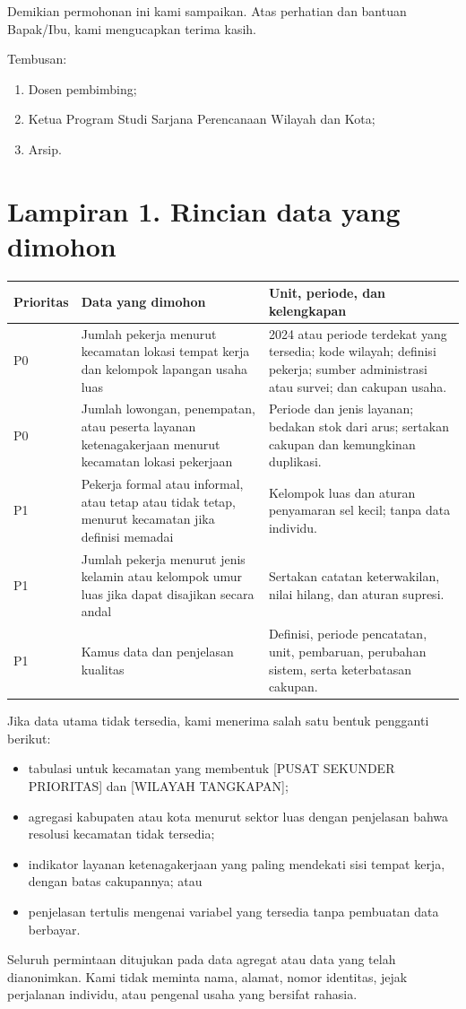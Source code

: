 \documentclass[12pt]{article}
\newcommand{\PusatSekunder}{[PUSAT SEKUNDER PRIORITAS]}
\newcommand{\WilayahTangkapan}{[WILAYAH TANGKAPAN]}
\newcommand{\PeriodeData}{2024 atau periode terdekat yang tersedia}
\begin{document}
Demikian permohonan ini kami sampaikan. Atas perhatian dan bantuan Bapak/Ibu, kami mengucapkan terima kasih.

\vspace{8pt}
Tembusan:
\begin{enumerate}
  \item Dosen pembimbing;
  \item Ketua Program Studi Sarjana Perencanaan Wilayah dan Kota;
  \item Arsip.
\end{enumerate}

\TandaTanganDTAP

\clearpage
\section*{Lampiran 1. Rincian data yang dimohon}

\renewcommand{\arraystretch}{1.25}
\begin{tabularx}{\textwidth}{@{}P{0.12\textwidth}P{0.34\textwidth}Y@{}}
\toprule
Prioritas & Data yang dimohon & Unit, periode, dan kelengkapan \\
\midrule
P0 & Jumlah pekerja menurut kecamatan lokasi tempat kerja dan kelompok lapangan usaha luas & \PeriodeData; kode wilayah; definisi pekerja; sumber administrasi atau survei; dan cakupan usaha. \\
P0 & Jumlah lowongan, penempatan, atau peserta layanan ketenagakerjaan menurut kecamatan lokasi pekerjaan & Periode dan jenis layanan; bedakan stok dari arus; sertakan cakupan dan kemungkinan duplikasi. \\
P1 & Pekerja formal atau informal, atau tetap atau tidak tetap, menurut kecamatan jika definisi memadai & Kelompok luas dan aturan penyamaran sel kecil; tanpa data individu. \\
P1 & Jumlah pekerja menurut jenis kelamin atau kelompok umur luas jika dapat disajikan secara andal & Sertakan catatan keterwakilan, nilai hilang, dan aturan supresi. \\
P1 & Kamus data dan penjelasan kualitas & Definisi, periode pencatatan, unit, pembaruan, perubahan sistem, serta keterbatasan cakupan. \\
\bottomrule
\end{tabularx}

\vspace{8pt}
Jika data utama tidak tersedia, kami menerima salah satu bentuk pengganti berikut:
\begin{itemize}
  \item tabulasi untuk kecamatan yang membentuk \PusatSekunder{} dan \WilayahTangkapan{};
  \item agregasi kabupaten atau kota menurut sektor luas dengan penjelasan bahwa resolusi kecamatan tidak tersedia;
  \item indikator layanan ketenagakerjaan yang paling mendekati sisi tempat kerja, dengan batas cakupannya; atau
  \item penjelasan tertulis mengenai variabel yang tersedia tanpa pembuatan data berbayar.
\end{itemize}

Seluruh permintaan ditujukan pada data agregat atau data yang telah dianonimkan. Kami tidak meminta nama, alamat, nomor identitas, jejak perjalanan individu, atau pengenal usaha yang bersifat rahasia.

\LampiranAbstraksi
\end{document}
